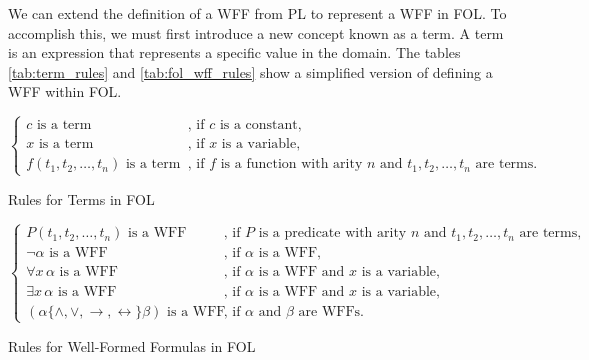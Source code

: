We can extend the definition of a \gls{WFF} from \gls{PL} to represent a \gls{WFF} in \gls{FOL}. To accomplish this, we must first introduce a new concept known as a term. A term is an expression that represents a specific value in the domain. The tables \ref{tab:term_rules} and \ref{tab:fol_wff_rules} show a simplified version of defining a \gls{WFF} within \gls{FOL}.

\begin{table}[h]
    \centering
    \[
    \left\{
    \begin{array}{ll}
    c \text{ is a term} & \text{, if } c \text{ is a constant,} \\
    x \text{ is a term} & \text{, if } x \text{ is a variable,} \\
    f(t_1, t_2, \dots, t_n) \text{ is a term} & \text{, if } f \text{ is a function with arity } n \text{ and } t_1, t_2, \dots, t_n \text{ are terms.}
    \end{array}
    \right.
    \]
    \caption{Rules for Terms in \gls{FOL}}
    \label{tab:term_rules}
\end{table}

\begin{table}[h]
    \centering
    \[
    \left\{
    \begin{array}{ll}
    P(t_1, t_2, \dots, t_n) \text{ is a WFF} & \text{, if } P \text{ is a predicate with arity } n \text{ and } t_1, t_2, \dots, t_n \text{ are terms,} \\
    \neg \alpha \text{ is a WFF} & \text{, if } \alpha \text{ is a WFF,} \\
    \forall x \, \alpha \text{ is a WFF} & \text{, if } \alpha \text{ is a WFF and } x \text{ is a variable,} \\
    \exists x \, \alpha \text{ is a WFF} & \text{, if } \alpha \text{ is a WFF and } x \text{ is a variable,} \\
    (\alpha \mathbin{\{\land, \lor, \rightarrow, \leftrightarrow\}} \beta) \text{ is a WFF} & \text{, if } \alpha \text{ and } \beta \text{ are WFFs.}
    \end{array}
    \right.
    \]
    \caption{Rules for Well-Formed Formulas in \gls{FOL}}
    \label{tab:fol_wff_rules}
\end{table}
    
